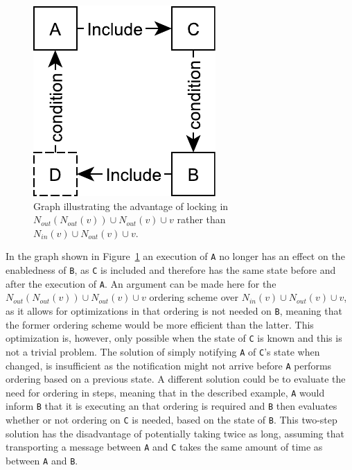 \documentclass{article}
\begin{document}
	\begin{figure}[ht!]
		\center
		\includegraphics[scale=0.5]{figures/dcr-graphs/second-degree-no-effect.pdf}
		\caption{Graph illustrating the advantage of locking in $N_{out}(N_{out}(v)) \cup N_{out}(v) \cup v$ rather than $N_{in}(v) \cup N_{out}(v) \cup v$.}
		\label{fig:second-degree-no-effect}
	\end{figure}

	In the graph shown in Figure~\ref{fig:second-degree-no-effect} an execution of \texttt{A} no longer has an effect on the enabledness of \texttt{B}, as \texttt{C} is included and therefore has the same state before and after the execution of \texttt{A}.
	An argument can be made here for the $N_{out}(N_{out}(v)) \cup N_{out}(v) \cup v$ ordering scheme over $N_{in}(v) \cup N_{out}(v) \cup v$, as it allows for optimizations in that ordering is not needed on \texttt{B}, meaning that the former ordering scheme would be more efficient than the latter.
	This optimization is, however, only possible when the state of \texttt{C} is known and this is not a trivial problem.
	The solution of simply notifying \texttt{A} of \texttt{C}'s state when changed, is insufficient as the notification might not arrive before \texttt{A} performs ordering based on a previous state.
	A different solution could be to evaluate the need for ordering in steps, meaning that in the described example, \texttt{A} would inform \texttt{B} that it is executing an that ordering is required and \texttt{B} then evaluates whether or not ordering on \texttt{C} is needed, based on the state of \texttt{B}.
	This two-step solution has the disadvantage of potentially taking twice as long, assuming that transporting a message between \texttt{A} and \texttt{C} takes the same amount of time as between \texttt{A} and \texttt{B}.
\end{document}
